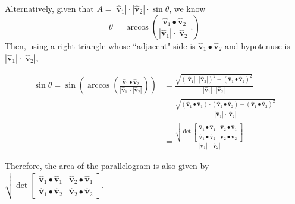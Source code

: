 \documentclass[newpage,hints,handout]{ximera}
\begin{document}
\begin{problem}
\begin{freeResponse}
Alternatively, given that $A = |\hat{\mathbf v}_{1}| \cdot |\hat{\mathbf v}_{2}| \cdot\sin\theta$, we know
\[
\theta = \arccos \left( 
	\frac{\hat{\mathbf v}_{1}\bullet\hat{\mathbf v}_{2}}{\left\vert \hat{\mathbf v}_{1}\right\vert \cdot\left\vert \hat{\mathbf v}_{2}\right\vert}.
		 \right)
\]
Then, using a right triangle whose ``adjacent" side is $\hat{\mathbf v}_{1}\bullet\hat{\mathbf v}_{2}$ and hypotenuse is $\left\vert \hat{\mathbf v}_{1}\right\vert \cdot\left\vert \hat{\mathbf v}_{2}\right\vert$,

\begin{align*}
\sin \theta = \sin\left(  \arccos\left(  \frac{\hat{\mathbf v}_{1}\bullet\hat{\mathbf v}_{2}}{\left\vert \hat{\mathbf v}_{1}\right\vert \cdot\left\vert 	\hat{\mathbf v}_{2}\right\vert} \right)  \right) 
	&= \frac{\sqrt{
	 \left( \left\vert \hat{\mathbf v}_{1}\right\vert \cdot\left\vert \hat{\mathbf v}_{2}\right\vert \right)^2 
	- \left( \hat{\mathbf v}_{1}\bullet\hat{\mathbf v}_{2} \right)^2}}{\left\vert \hat{\mathbf v}_{1}\right\vert \cdot\left\vert \hat{\mathbf v}_{2}\right\vert}  \\
	&= \frac{\sqrt{ 
	\left( \hat{\mathbf v}_{1}\bullet\hat{\mathbf v}_{1} \right) \cdot \left(\hat{\mathbf v}_{2}\bullet\hat{\mathbf v}_{2} \right)
	- \left( \hat{\mathbf v}_{1}\bullet\hat{\mathbf v}_{2} \right)^2}}{\left\vert\hat{\mathbf v}_{1}\right\vert \cdot\left\vert \hat{\mathbf v}_{2}\right\vert}\\
	&=\frac{\sqrt{\det
    	\begin{bmatrix}
      		\hat{\mathbf v}_{1}\bullet\hat{\mathbf v}_{1} & \hat{\mathbf v}_{2}\bullet\hat{\mathbf v}_{1}\\
      		\hat{\mathbf v}_{1}\bullet\hat{\mathbf v}_{2} & \hat{\mathbf v}_{2}\bullet\hat{\mathbf v}_{2}
    	\end{bmatrix}}}{\left\vert\hat{\mathbf v}_{1}\right\vert \cdot\left\vert \hat{\mathbf v}_{2}\right\vert}
\end{align*}

Therefore, the area of the parallelogram is also given by
$\sqrt{\det
    \begin{bmatrix}
      \hat{\mathbf v}_{1}\bullet\hat{\mathbf v}_{1} & \hat{\mathbf v}_{2}\bullet\hat{\mathbf v}_{1}\\
      \hat{\mathbf v}_{1}\bullet\hat{\mathbf v}_{2} & \hat{\mathbf v}_{2}\bullet\hat{\mathbf v}_{2}
    \end{bmatrix}}$.

\end{freeResponse}

\end{problem}
\end{document}
